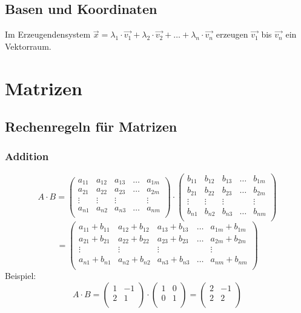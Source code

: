 \subsection{Basen und Koordinaten}
Im Erzeugendensystem $\vec{x} = \lambda_1 \cdot \vec{v_1} + \lambda_2
\cdot \vec{v_2} + \dots + \lambda_n \cdot \vec{v_n}$ erzeugen
$\vec{v_1}$ bis $\vec{v_n}$ ein Vektorraum.


\section{Matrizen}
\subsection{Rechenregeln für Matrizen}
\subsubsection{Addition}
\[ A \cdot B =
  \begin {pmatrix}
    a_{11} & a_{12} & a_{13} & \hdots & a_{1m} \\
    a_{21} & a_{22} & a_{23} & \hdots & a_{2m} \\
    \vdots  & \vdots  & \vdots  &        & \vdots  \\
    a_{n1} & a_{n2} & a_{n3} & \hdots & a_{nm} \\
  \end {pmatrix} \cdot 
  \begin {pmatrix}
    b_{11} & b_{12} & b_{13} & \hdots & b_{1m} \\
    b_{21} & b_{22} & b_{23} & \hdots & b_{2m} \\
    \vdots  & \vdots  & \vdots  &        & \vdots  \\
    b_{n1} & b_{n2} & b_{n3} & \hdots & b_{nm} \\
  \end {pmatrix} \]
\[ = \begin {pmatrix}
    a_{11} + b_{11} & a_{12} + b_{12} & a_{13} + b_{13} & \hdots &
      a_{1m} + b_{1m} \\
    a_{21} + b_{21} & a_{22} + b_{22} & a_{23} + b_{23} & \hdots &
      a_{2m} + b_{2m} \\
    \vdots  & \vdots  & \vdots  &        & \vdots  \\
    a_{n1} + b_{n1} & a_{n2} + b_{n2} & a_{n3} + b_{n3} & \hdots &
    a_{nm} + b_{nm} \\
  \end {pmatrix} \]
Beispiel:
\[ A \cdot B =
  \begin {pmatrix} 1 & -1 \\ 2 & 1 \\ \end {pmatrix} \cdot
  \begin {pmatrix} 1 & 0 \\ 0 & 1 \\ \end {pmatrix} =
  \begin {pmatrix} 2 & -1 \\ 2 & 2 \\ \end {pmatrix} 
\]


